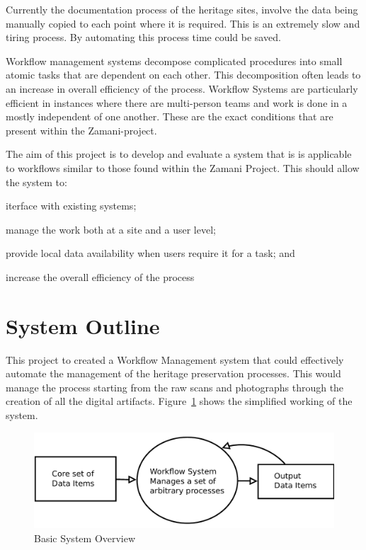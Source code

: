 \documentclass[12pt,a4paper]{report}
\begin{document}
    Currently the documentation process of the heritage sites, involve the data being
    manually copied to each point where it is required. This is an extremely slow and
    tiring process. By automating this process time could be saved.

    Workflow management systems decompose complicated procedures into small atomic tasks
    that are dependent on each other\cite{Taylor:2006:WES:1196459}. This decomposition
    often leads to an increase in overall efficiency of the process. Workflow Systems
    are particularly efficient in instances where there are multi-person teams and work
    is done in a mostly independent of one another. These are the exact conditions that
    are present within the Zamani-project.

    The aim of this project is to develop and evaluate a system that is is applicable
    to workflows similar to those found within the Zamani Project. This should allow the
    system to: \begin{inparaenum} \item iterface with existing systems; \item manage the
    work both at a site and a user level; \item provide local data availability when users
    require it for a task; and \item increase the overall efficiency of the process
    \end{inparaenum}




\section{System Outline}
    This project to created a Workflow Management system that could effectively
    automate the management of the heritage preservation processes.
	This would manage the process starting from the raw scans and photographs
	through the creation of all the digital artifacts. Figure~\ref{intro:basic}
	shows the simplified working of the system.
	\begin{figure}[!h]
		\begin{center}
			\includegraphics[scale=0.34]{figures/basic_system.pdf}
		\end{center}
		\caption{Basic System Overview}
		\label{intro:basic}
	\end{figure}
\end{document}
